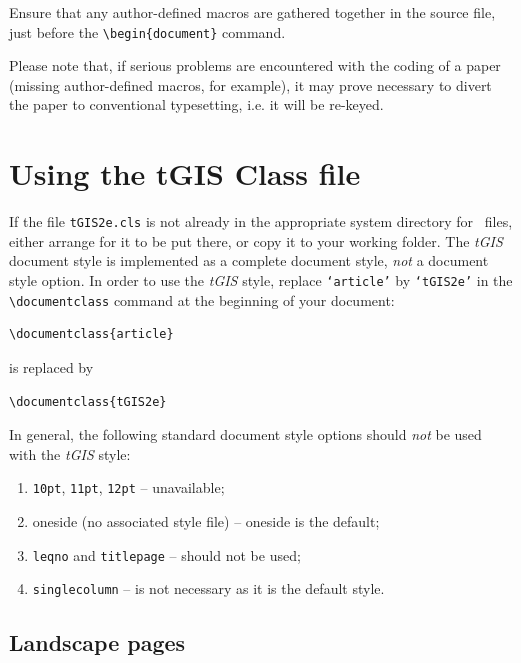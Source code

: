 \documentclass[]{tGIS2e}
\begin{document}
Ensure that any author-defined macros are gathered together in the source file, just before the
\verb"\begin{document}" command.

Please note that, if serious problems are encountered with the coding of a paper (missing author-defined macros,
for example), it may prove necessary to divert the paper to conventional typesetting, i.e. it will be re-keyed.

\section{Using the {\bi tGIS} Class file}

If the file {\tt tGIS2e.cls} is not already in the appropriate system directory for \LaTeXe\ files, either
arrange for it to be put there, or copy it to your working folder. The {\it tGIS} document style is implemented
as a complete document style, {\em not\/} a document style option. In order to use the {\it tGIS} style, replace
{\tt `article'} by {\tt `tGIS2e'} in the \verb"\documentclass" command at the beginning of your document:
%
\begin{verbatim}
\documentclass{article}
\end{verbatim}
%
is replaced by
%
\begin{verbatim}
\documentclass{tGIS2e}
\end{verbatim}
%
In general, the following standard document style options should {\em not\/} be used with the {\it tGIS} style:
%
\begin{enumerate}
   \item {\tt 10pt}, {\tt 11pt}, {\tt 12pt} -- unavailable;
   \item oneside (no associated style file) -- oneside is the default;
   \item {\tt leqno} and {\tt titlepage} -- should not be used;
   \item {\tt singlecolumn} -- is not necessary as it is the default style.
\end{enumerate}
%

\subsection{Landscape pages}\label{eps}
\end{document}
